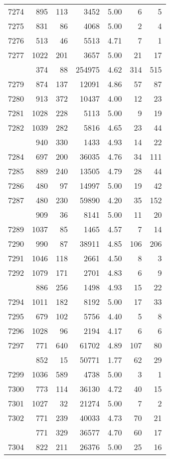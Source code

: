 \documentclass[
]{article}
\begin{document}
\begin{table}
\begin{tabular}[t]{lrrrrrr}
7274 & 895 & 113 & 3452 & 5.00 & 6 & 5\\
7275 & 831 & 86 & 4068 & 5.00 & 2 & 4\\
7276 & 513 & 46 & 5513 & 4.71 & 7 & 1\\
7277 & 1022 & 201 & 3657 & 5.00 & 21 & 17\\
\addlinespace
7278 & 374 & 88 & 254975 & 4.62 & 314 & 515\\
7279 & 874 & 137 & 12091 & 4.86 & 57 & 87\\
7280 & 913 & 372 & 10437 & 4.00 & 12 & 23\\
7281 & 1028 & 228 & 5113 & 5.00 & 9 & 19\\
7282 & 1039 & 282 & 5816 & 4.65 & 23 & 44\\
\addlinespace
7283 & 940 & 330 & 1433 & 4.93 & 14 & 22\\
7284 & 697 & 200 & 36035 & 4.76 & 34 & 111\\
7285 & 889 & 240 & 13505 & 4.79 & 28 & 44\\
7286 & 480 & 97 & 14997 & 5.00 & 19 & 42\\
7287 & 480 & 230 & 59890 & 4.20 & 35 & 152\\
\addlinespace
7288 & 909 & 36 & 8141 & 5.00 & 11 & 20\\
7289 & 1037 & 85 & 1465 & 4.57 & 7 & 14\\
7290 & 990 & 87 & 38911 & 4.85 & 106 & 206\\
7291 & 1046 & 118 & 2661 & 4.50 & 8 & 3\\
7292 & 1079 & 171 & 2701 & 4.83 & 6 & 9\\
\addlinespace
7293 & 886 & 256 & 1498 & 4.93 & 15 & 22\\
7294 & 1011 & 182 & 8192 & 5.00 & 17 & 33\\
7295 & 679 & 102 & 5756 & 4.40 & 5 & 8\\
7296 & 1028 & 96 & 2194 & 4.17 & 6 & 6\\
7297 & 771 & 640 & 61702 & 4.89 & 107 & 80\\
\addlinespace
7298 & 852 & 15 & 50771 & 1.77 & 62 & 29\\
7299 & 1036 & 589 & 4738 & 5.00 & 3 & 1\\
7300 & 773 & 114 & 36130 & 4.72 & 40 & 15\\
7301 & 1027 & 32 & 21274 & 5.00 & 7 & 2\\
7302 & 771 & 239 & 40033 & 4.73 & 70 & 21\\
\addlinespace
7303 & 771 & 329 & 36577 & 4.70 & 60 & 17\\
7304 & 822 & 211 & 26376 & 5.00 & 25 & 16\\

\end{tabular}
\end{table}
\end{document}
